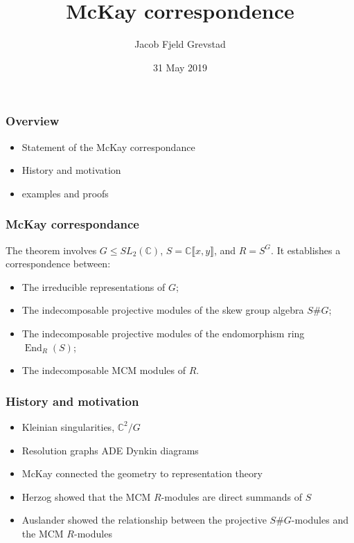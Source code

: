 \documentclass[screen, aspectratio=43]{beamer}
\title{McKay correspondence}
\author[J. F. Grevstad]{Jacob Fjeld Grevstad}
\institute[NTNU]{Department of Mathematical sciences, NTNU}
\date{31 May 2019}
\theoremstyle{definition}
\newcommand{\C}{\mathbb{C}}
\DeclareMathOperator{\End}{End}
\begin{document}
\begin{frame}
  \titlepage
\end{frame}


\begin{frame}
	\frametitle{Overview}
	\begin{itemize}
		\item Statement of the McKay correspondance
		\item History and motivation
		\item examples and proofs
	\end{itemize}
\end{frame}

\begin{frame}
	\frametitle{McKay correspondance}
	The theorem involves $G \leq SL_2(\C)$, $S= \C \llbracket x, y \rrbracket$, and $R = S^G$. It establishes a correspondence between:
	\begin{itemize}
		\item The irreducible representations of $G$; 
		\item The indecomposable projective modules of the skew group algebra $S\#G$;
		\item The indecomposable projective modules of the endomorphism ring $\End_R(S)$;
		\item The indecomposable MCM modules of $R$.
	\end{itemize}
\end{frame}

\begin{frame}
	\frametitle{History and motivation}
	\begin{itemize}
		\item Kleinian singularities, $\C^2 / G$
		\item Resolution graphs ADE Dynkin diagrams 
		\item McKay connected the geometry to representation theory
		\item Herzog showed that the MCM $R$-modules are direct summands of $S$
		\item Auslander showed the relationship between the projective $S\#G$-modules and the MCM $R$-modules
	\end{itemize}
\end{frame}
\end{document}
